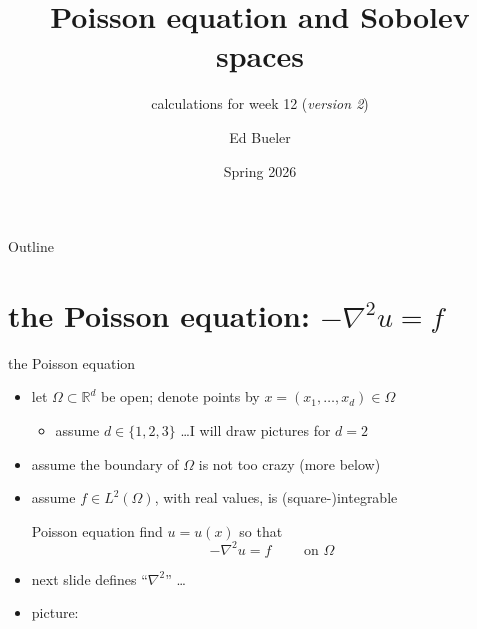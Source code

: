 \documentclass[10pt,
               svgnames,
               hyperref={colorlinks,
                         citecolor=DeepPink4,
                         linkcolor=FireBrick,
                         urlcolor=blue},
               usepdftitle=false]{beamer}
\title[Poisson equation and Sobolev spaces]{Poisson equation and Sobolev spaces}
\subtitle{calculations for week 12 \quad (\emph{version 2})}
\author{Ed Bueler}
\institute[]{UAF Math 617 Functional Analysis}
\date{Spring 2026}
\newcommand{\RR}{\mathbb{R}}
\newcommand{\grad}{\nabla}
\begin{document}
\beamertemplatenavigationsymbolsempty

\begin{frame}
  \maketitle
\end{frame}


\begin{frame}{Outline}
  \tableofcontents[hideallsubsections]
\end{frame}

\AtBeginSection[]
{%
}


\section{the Poisson equation: $- \grad^2 u = f$}

\begin{frame}{the Poisson equation}

\begin{itemize}
\item let $\Omega \subset \RR^d$ be open; denote points by $x=(x_1,\dots,x_d)\in\Omega$
    \begin{itemize}
    \item[$\circ$] assume $d\in\{1,2,3\}$ \dots I will draw pictures for $d=2$
    \end{itemize}
\item assume the boundary of $\Omega$ is not too crazy (more below)
\item assume $f\in L^2(\Omega)$, with real values, is (square-)integrable

\begin{block}{Poisson equation}  find $u=u(x)$ so that
   $$- \grad^2 u = f \qquad \text{ on } \Omega$$
\end{block}

\item next slide defines ``$\grad^2$'' \dots
\item picture:
\end{itemize}

\vspace{35mm}
\end{frame}
\end{document}
